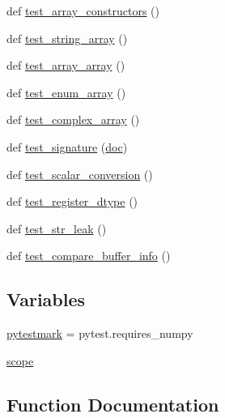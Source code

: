 \begin{DoxyCompactItemize}
\item 
def \mbox{\hyperlink{namespacetest__numpy__dtypes_ada5a065bb22cb3390833d04b26ae7061}{test\+\_\+array\+\_\+constructors}} ()
\item 
def \mbox{\hyperlink{namespacetest__numpy__dtypes_a5f83a93b46469713e8001c8409f4633e}{test\+\_\+string\+\_\+array}} ()
\item 
def \mbox{\hyperlink{namespacetest__numpy__dtypes_a3a8fe3a9e3d43b9fb841fa66ac828aaa}{test\+\_\+array\+\_\+array}} ()
\item 
def \mbox{\hyperlink{namespacetest__numpy__dtypes_a167cf36acfdd3ba28dcc2e4854b1efec}{test\+\_\+enum\+\_\+array}} ()
\item 
def \mbox{\hyperlink{namespacetest__numpy__dtypes_a68424148be078075e8786e33dee91f51}{test\+\_\+complex\+\_\+array}} ()
\item 
def \mbox{\hyperlink{namespacetest__numpy__dtypes_aea443d01a341ec754aef51ac459900fd}{test\+\_\+signature}} (\mbox{\hyperlink{structdoc}{doc}})
\item 
def \mbox{\hyperlink{namespacetest__numpy__dtypes_a33133ffeed540edf7871c818d625abe4}{test\+\_\+scalar\+\_\+conversion}} ()
\item 
def \mbox{\hyperlink{namespacetest__numpy__dtypes_ab747d0e920039ec1bf71b2bd847ecf80}{test\+\_\+register\+\_\+dtype}} ()
\item 
def \mbox{\hyperlink{namespacetest__numpy__dtypes_addc828dc94fb30b85eb1bfa4f0f8a60c}{test\+\_\+str\+\_\+leak}} ()
\item 
def \mbox{\hyperlink{namespacetest__numpy__dtypes_a11175016f90d6707926984c3468f2b2e}{test\+\_\+compare\+\_\+buffer\+\_\+info}} ()
\end{DoxyCompactItemize}
\subsection*{Variables}
\begin{DoxyCompactItemize}
\item 
\mbox{\hyperlink{namespacetest__numpy__dtypes_ada3f55ad09f54d65d629b7a84d5816e4}{pytestmark}} = pytest.\+requires\+\_\+numpy
\item 
\mbox{\hyperlink{namespacetest__numpy__dtypes_a53cb220b51eb4b61021cc39f945981d0}{scope}}
\end{DoxyCompactItemize}


\subsection{Function Documentation}
\mbox{\label{namespacetest__numpy__dtypes_ab4b41fdc1a6ed611d728987ec73739a2}} 
